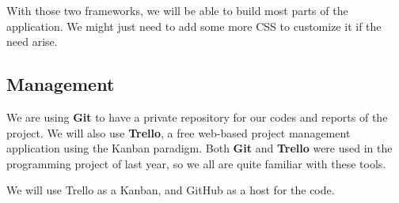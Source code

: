 With those two frameworks, we will be able to build most parts of the application. We might just need to add some more CSS to customize it if the need arise.

\subsection{Management}

We are using \textbf{Git} to have a private repository for our codes and reports of the project. We will also use \textbf{Trello}, a free web-based project management application using the Kanban paradigm. Both \textbf{Git} and \textbf{Trello} were used in the programming project of last year, so we all are quite familiar with these tools.

We will use Trello as a Kanban, and GitHub as a host for the code. \newline
